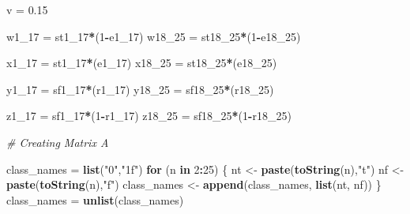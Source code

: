 \documentclass[]{article}
\newenvironment{Shaded}{\begin{snugshade}}{\end{snugshade}}
\newcommand{\CommentTok}[1]{\textcolor[rgb]{0.56,0.35,0.01}{\textit{#1}}}
\newcommand{\ControlFlowTok}[1]{\textcolor[rgb]{0.13,0.29,0.53}{\textbf{#1}}}
\newcommand{\DecValTok}[1]{\textcolor[rgb]{0.00,0.00,0.81}{#1}}
\newcommand{\FloatTok}[1]{\textcolor[rgb]{0.00,0.00,0.81}{#1}}
\newcommand{\KeywordTok}[1]{\textcolor[rgb]{0.13,0.29,0.53}{\textbf{#1}}}
\newcommand{\NormalTok}[1]{#1}
\newcommand{\OperatorTok}[1]{\textcolor[rgb]{0.81,0.36,0.00}{\textbf{#1}}}
\newcommand{\StringTok}[1]{\textcolor[rgb]{0.31,0.60,0.02}{#1}}
\begin{document}
\begin{Shaded}
\begin{Highlighting}[]
\NormalTok{v =}\StringTok{ }\FloatTok{0.15}

\NormalTok{w1_}\DecValTok{17}\NormalTok{ =}\StringTok{ }\NormalTok{st1_}\DecValTok{17}\OperatorTok{*}\NormalTok{(}\DecValTok{1}\OperatorTok{-}\NormalTok{e1_}\DecValTok{17}\NormalTok{)}
\NormalTok{w18_}\DecValTok{25}\NormalTok{ =}\StringTok{ }\NormalTok{st18_}\DecValTok{25}\OperatorTok{*}\NormalTok{(}\DecValTok{1}\OperatorTok{-}\NormalTok{e18_}\DecValTok{25}\NormalTok{)}

\NormalTok{x1_}\DecValTok{17}\NormalTok{ =}\StringTok{ }\NormalTok{st1_}\DecValTok{17}\OperatorTok{*}\NormalTok{(e1_}\DecValTok{17}\NormalTok{)}
\NormalTok{x18_}\DecValTok{25}\NormalTok{ =}\StringTok{ }\NormalTok{st18_}\DecValTok{25}\OperatorTok{*}\NormalTok{(e18_}\DecValTok{25}\NormalTok{)}

\NormalTok{y1_}\DecValTok{17}\NormalTok{ =}\StringTok{ }\NormalTok{sf1_}\DecValTok{17}\OperatorTok{*}\NormalTok{(r1_}\DecValTok{17}\NormalTok{)}
\NormalTok{y18_}\DecValTok{25}\NormalTok{ =}\StringTok{ }\NormalTok{sf18_}\DecValTok{25}\OperatorTok{*}\NormalTok{(r18_}\DecValTok{25}\NormalTok{)}

\NormalTok{z1_}\DecValTok{17}\NormalTok{ =}\StringTok{ }\NormalTok{sf1_}\DecValTok{17}\OperatorTok{*}\NormalTok{(}\DecValTok{1}\OperatorTok{-}\NormalTok{r1_}\DecValTok{17}\NormalTok{)}
\NormalTok{z18_}\DecValTok{25}\NormalTok{ =}\StringTok{ }\NormalTok{sf18_}\DecValTok{25}\OperatorTok{*}\NormalTok{(}\DecValTok{1}\OperatorTok{-}\NormalTok{r18_}\DecValTok{25}\NormalTok{)}

\CommentTok{# Creating Matrix A}

\NormalTok{class_names =}\StringTok{ }\KeywordTok{list}\NormalTok{(}\StringTok{"0"}\NormalTok{,}\StringTok{"1f"}\NormalTok{)}
\ControlFlowTok{for}\NormalTok{ (n }\ControlFlowTok{in} \DecValTok{2}\OperatorTok{:}\DecValTok{25}\NormalTok{) \{}
\NormalTok{  nt <-}\StringTok{ }\KeywordTok{paste}\NormalTok{(}\KeywordTok{toString}\NormalTok{(n),}\StringTok{"t"}\NormalTok{)}
\NormalTok{  nf <-}\StringTok{ }\KeywordTok{paste}\NormalTok{(}\KeywordTok{toString}\NormalTok{(n),}\StringTok{"f"}\NormalTok{)}
\NormalTok{  class_names <-}\StringTok{ }\KeywordTok{append}\NormalTok{(class_names, }\KeywordTok{list}\NormalTok{(nt, nf))}
\NormalTok{\}}
\NormalTok{class_names =}\StringTok{ }\KeywordTok{unlist}\NormalTok{(class_names)}


\end{Highlighting}
\end{Shaded}
\end{document}
